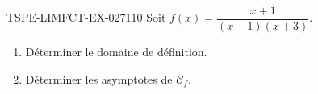 \begin{exercice}{TSPE-LIMFCT-EX-027}{1}{10}
Soit $f(x) = \dfrac{x+1}{(x-1)(x+3)}$.
\begin{enumerate}
  \item Déterminer le domaine de définition.
  \item Déterminer les asymptotes de $\mathcal{C}_f$.
\end{enumerate}
\end{exercice}
